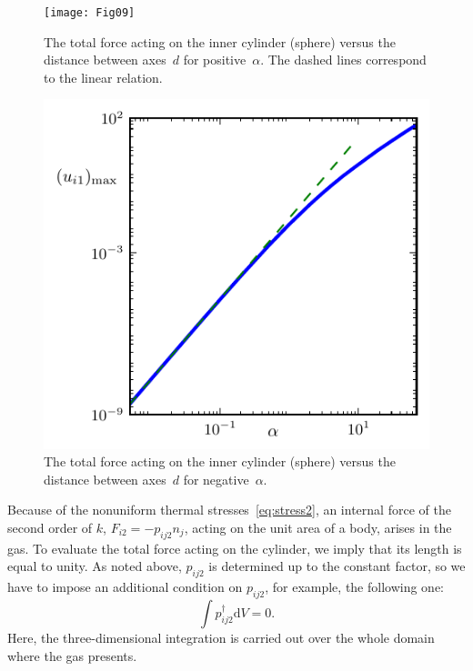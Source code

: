 \documentclass[smallextended, referee]{svjour3} %
\begin{document}
\begin{figure}[ht]
    \centering
    \begin{minipage}{.48\textwidth}
        \centering
        \texttt{[image: Fig09]}
        \caption{The total force acting on the inner cylinder (sphere)
        	versus the distance between axes~\(d\) for positive~\(\alpha\).
        	The dashed lines correspond to the linear relation.}
        \label{fig:forces:total}
    \end{minipage}
    \quad
    \begin{minipage}{.48\textwidth}
        \centering
        \includegraphics{Fig10}
        \caption{The total force acting on the inner cylinder (sphere)
        	versus the distance between axes~\(d\) for negative~\(\alpha\).}
        \label{fig:forces:inverse}
    \end{minipage}
\end{figure}

Because of the nonuniform thermal stresses~\eqref{eq:stress2}, an internal force of the second order of \(k\),
\(F_{i2} = -p_{ij2}n_j\), acting on the unit area of a body, arises in the gas.
To evaluate the total force acting on the cylinder, we imply that its length is equal to unity.
As noted above, \(p_{ij2}\) is determined up to the constant factor,
so we have to impose an additional condition on \(p_{ij2}\), for example, the following one:
\begin{equation}\label{eq:dag_condition}
    \int p^\dag_{ij2}\mathrm{d}V = 0.
\end{equation}
Here, the three-dimensional integration is carried out over the whole domain where the gas presents.
\end{document}
